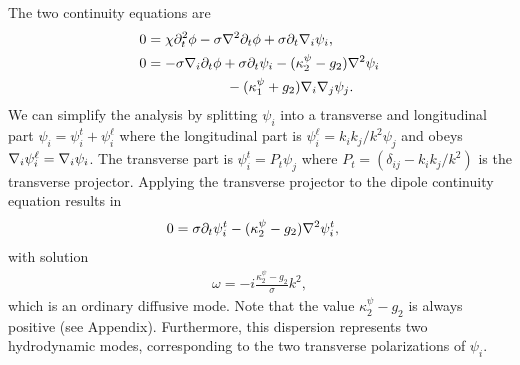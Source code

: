 The two continuity equations are 
\begin{align}
0 &= \chi \partial_t^2 \phi - \sigma \nabla^2 \partial_t \phi + \sigma \partial_t \nabla_i\psi_i,\nonumber\\
0 &= -\sigma \nabla_i \partial_t \phi + \sigma\partial_t \psi_i - (\kappa^\psi_2 - g_2) \nabla^2 \psi_i \nonumber\\
&\hspace{2cm}- (\kappa^\psi_1 +g_2) \nabla_i\nabla_j \psi_j.
\end{align}
We can simplify the analysis by splitting $\psi_i$ into a transverse and longitudinal part $\psi_i = \psi_i^t + \psi_i^\ell$ where the longitudinal part is $\psi_i^\ell = k_ik_j/k^2 \psi_j$ and obeys $\nabla_i\psi_i^\ell = \nabla_i\psi_i$. The transverse part is $\psi_i^t = P_t\psi_j$ where $P_t = (\delta_{ij} - k_ik_j/k^2)$ is the transverse projector. Applying the transverse projector to the dipole continuity equation results in 
\begin{align}
0 &= \sigma \partial_t \psi_i^t - (\kappa^\psi_2 - g_2) \nabla^2 \psi_i^t,
\end{align}
with solution
\begin{align}
\omega = -i \frac{\kappa^\psi_2-g_2}{\sigma} k^2, \label{eqn:dctran}
\end{align}
which is an ordinary diffusive mode. Note that the value $\kappa^\psi_2-g_2$ is always positive (see Appendix). Furthermore, this dispersion represents two hydrodynamic modes, corresponding to the two transverse polarizations of $\psi_i$.

